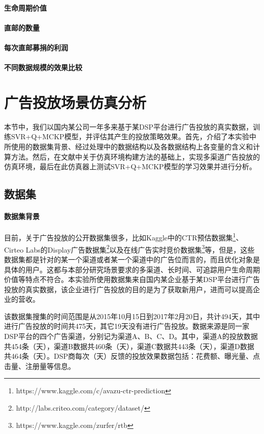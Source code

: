 \paragraph{生命周期价值}

\paragraph{直邮的数量}

\paragraph{每次直邮募捐的利润}

\paragraph{不同数据规模的效果比较}

\section{广告投放场景仿真分析}
本节中，我们以国内某公司一年多来基于某DSP平台进行广告投放的真实数据，训练SVR+Q+MCKP模型，并评估其产生的投放策略效果。首先，介绍了本实验中所使用的数据集背景、经过处理中的数据结构以及各数据结构上各变量的含义和计算方法。然后，在文献\citep{pednault2002sequential}中关于仿真环境构建方法的基础上，实现多渠道广告投放的仿真环境，最后在此仿真器上测试SVR+Q+MCKP模型的学习效果并进行分析。

\subsection{数据集}
\paragraph{数据集背景}
目前，关于广告投放的公开数据集很多，比如Kaggle中的CTR预估数据集\footnote{https://www.kaggle.com/c/avazu-ctr-prediction}、Cirteo Labs的Display广告数据集\footnote{http://labs.criteo.com/category/dataset/}以及在线广告实时竞价数据集\footnote{https://www.kaggle.com/zurfer/rtb}等，但是，这些数据集都是针对的某一个渠道或者某一个渠道中的广告位而言的，而且优化对象是具体的用户。这都与本部分研究场景要求的多渠道、长时间、可追踪用户生命周期价值等特点不符合。本实验所使用数据集来自国内某企业基于某DSP平台进行广告投放的真实数据，该企业进行广告投放的目的是为了获取新用户，进而可以提高企业的营收。

该数据集搜集的时间范围是从2015年10月15日到2017年2月20日，共计494天，其中进行广告投放的时间共475天，其它19天没有进行广告投放。数据来源是同一家DSP平台的四个广告渠道，分别记为渠道A、B、C、D。其中，渠道A的投放数据共454条（天），渠道B数据共460条（天），渠道C数据共443条（天），渠道D数据共464条（天）。DSP商每次（天）反馈的投放效果数据包括：花费额、曝光量、点击量、注册量等信息。

